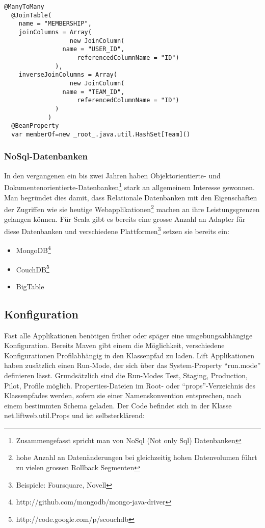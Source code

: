 \begin{lstlisting}[caption=Relation Mapping mit JPA]
@ManyToMany
  @JoinTable(
    name = "MEMBERSHIP",
    joinColumns = Array(
    			  new JoinColumn(
			    name = "USER_ID", 
    			    referencedColumnName = "ID")
			  ),
    inverseJoinColumns = Array(
    			  new JoinColumn(
  		  	    name = "TEAM_ID",
    			    referencedColumnName = "ID")
			  )
			)
  @BeanProperty
  var memberOf=new _root_.java.util.HashSet[Team]()
  \end{lstlisting}
  
\subsubsection{NoSql-Datenbanken}
In den vergangenen ein bis zwei Jahren haben Objektorientierte- und Dokumentenorientierte-Datenbanken\footnote{Zusammengefasst spricht man von NoSql (Not only Sql) Datenbanken} stark an allgemeinem Interesse gewonnen. Man\cite{wiki:NoSQL} begr\"undet dies damit, dass Relationale Datenbanken mit den Eigenschaften der Zugriffen wie sie heutige Webapplikationen\footnote{hohe Anzahl an Daten\"anderungen bei gleichzeitig hohen Datenvolumen f\"uhrt zu vielen grossen Rollback Segmenten} machen an ihre Leistungsgrenzen gelangen k\"onnen.
F\"ur Scala gibt es bereits eine grosse Anzahl an Adapter f\"ur diese Datenbanken und verschiedene Plattformen\footnote{Beispiele: Foursquare, Novell} setzen sie bereits ein:
\begin{itemize}
\item MongoDB\footnote{http://github.com/mongodb/mongo-java-driver}
\item CouchDB\footnote{http://code.google.com/p/scouchdb}
\item BigTable
\end{itemize}

\subsection{Konfiguration}
Fast alle Applikationen ben\"otigen fr\"uher oder sp\"ager eine umgebungsabh\"angige Konfiguration. Bereits Maven gibt einem die M\"oglichkeit, verschiedene Konfigurationen Profilabh\"angig in den Klassenpfad zu laden. Lift Applikationen haben zus\"atzlich einen Run-Mode, der sich \"uber das System-Property ``run.mode'' definieren l\"asst. Grunds\"atzlich sind die Run-Modes Test, Staging, Production, Pilot, Profile m\"oglich. Properties-Dateien im Root- oder ``props''-Verzeichnis des Klassenpfades werden, sofern sie einer Namenskonvention entsprechen, nach einem bestimmten Schema geladen. Der Code befindet sich in der Klasse net.liftweb.util.Props und ist selbsterkl\"arend:

